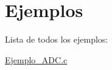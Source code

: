 \section{Ejemplos}
Lista de todos los ejemplos\+:\begin{DoxyCompactItemize}
\item 
\hyperlink{Ejemplo_ADC_8c-example}{Ejemplo\+\_\+\+A\+D\+C.\+c}
\end{DoxyCompactItemize}
